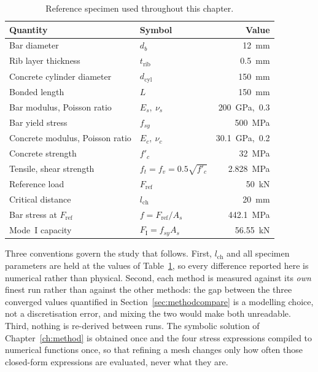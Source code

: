 \begin{table}[htbp]
\centering
\caption{Reference specimen used throughout this chapter.}
\label{tab:refspec}
\begin{tabular*}{\textwidth}{@{\extracolsep{\fill}}llr@{}}
\toprule
Quantity & Symbol & Value \\
\midrule
Bar diameter               & $d_b$              & \SI{12}{\milli\metre} \\
Rib layer thickness        & $t_{\mathrm{rib}}$ & \SI{0.5}{\milli\metre} \\
Concrete cylinder diameter & $d_{\mathrm{cyl}}$ & \SI{150}{\milli\metre} \\
Bonded length              & $L$                & \SI{150}{\milli\metre} \\
Bar modulus, Poisson ratio & $E_s,\ \nu_s$      & \SI{200}{\giga\pascal},\ 0.3 \\
Bar yield stress           & $f_{sy}$           & \SI{500}{\mega\pascal} \\
Concrete modulus, Poisson ratio & $E_c,\ \nu_c$ & \SI{30.1}{\giga\pascal},\ 0.2 \\
Concrete strength          & $f'_c$             & \SI{32}{\mega\pascal} \\
Tensile, shear strength    & $f_t = f_v = 0.5\sqrt{f'_c}$ & \SI{2.828}{\mega\pascal} \\
Reference load             & $F_{\mathrm{ref}}$ & \SI{50}{\kilo\newton} \\
Critical distance          & $l_{\mathrm{ch}}$  & \SI{20}{\milli\metre} \\
\midrule
Bar stress at $F_{\mathrm{ref}}$ & $f = F_{\mathrm{ref}}/A_s$ & \SI{442.1}{\mega\pascal} \\
Mode~I capacity            & $F_{\mathrm{I}} = f_{sy}A_s$ & \SI{56.55}{\kilo\newton} \\
\bottomrule
\end{tabular*}
\end{table}
 
Three conventions govern the study that follows. First, $l_{\mathrm{ch}}$ and
all specimen parameters are held at the values of Table~\ref{tab:refspec}, so
every difference reported here is numerical rather than physical. Second,
each method is measured against its \emph{own} finest run rather than against the
other methods: the gap between the three converged values quantified in
Section~\ref{sec:methodcompare} is a modelling choice, not a discretisation
error, and mixing the two would make both unreadable. Third, nothing is
re-derived between runs. The symbolic solution of
Chapter~\ref{ch:method} is obtained once and the four stress expressions
compiled to numerical functions once, so that refining a mesh changes only
how often those closed-form expressions are evaluated, never what they are.
 

